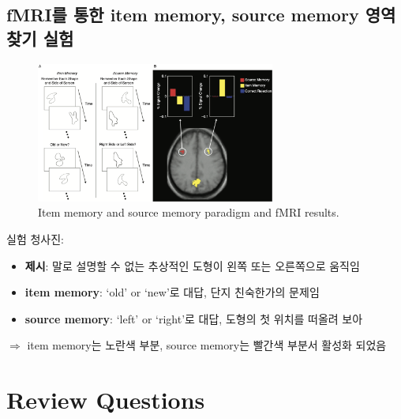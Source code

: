 \documentclass[../note.tex]{subfiles}
\begin{document}
\subsection{fMRI를 통한 item memory, source memory 영역 찾기 실험}
\begin{figure}[h]
  \centering
  \includegraphics[width=0.7\textwidth]{image/item_source}
  \caption{Item memory and source memory paradigm and fMRI results.}
  \label{fig:item_source}
\end{figure}

실험 청사진:
\begin{itemize}
  \item \textbf{제시}: 말로 설명할 수 없는 추상적인 도형이 왼쪽 또는 오른쪽으로 움직임
  \item \textbf{item memory}: `old' or `new'로 대답, 단지 친숙한가의 문제임
  \item \textbf{source memory}: `left' or `right'로 대답, 도형의 첫 위치를 떠올려 보아
\end{itemize}

$\Rightarrow$ item memory는 노란색 부분, source memory는 빨간색 부분서 활성화 되었음

\section*{Review Questions}
\end{document}
